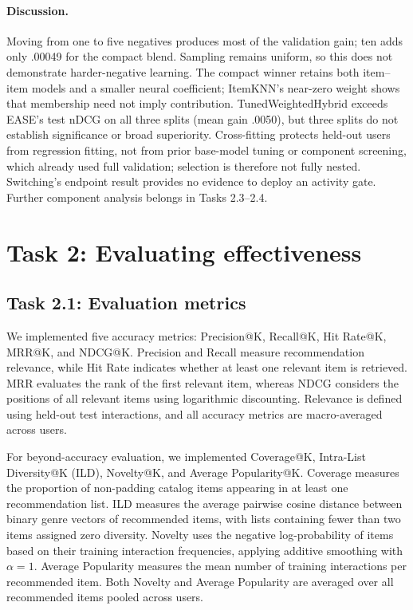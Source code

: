\documentclass[12pt,a4paper]{article}   %
\begin{document}
\paragraph{Discussion.}
Moving from one to five negatives produces most of the validation gain; ten adds only .00049 for the compact blend. Sampling remains uniform, so this does not demonstrate harder-negative learning. The compact winner retains both item--item models and a smaller neural coefficient; ItemKNN's near-zero weight shows that membership need not imply contribution. TunedWeightedHybrid exceeds EASE's test nDCG on all three splits (mean gain .0050), but three splits do not establish significance or broad superiority. Cross-fitting protects held-out users from regression fitting, not from prior base-model tuning or component screening, which already used full validation; selection is therefore not fully nested. Switching's endpoint result provides no evidence to deploy an activity gate. Further component analysis belongs in Tasks 2.3--2.4.

\newpage
\section{Task 2: Evaluating effectiveness}

\subsection{Task 2.1: Evaluation metrics}

We implemented five accuracy metrics: Precision@K,
Recall@K, Hit Rate@K, MRR@K, and NDCG@K.
Precision and Recall measure recommendation relevance,
while Hit Rate indicates whether at least one relevant
item is retrieved. MRR evaluates the rank of the first
relevant item, whereas NDCG considers the positions of
all relevant items using logarithmic discounting.
Relevance is defined using held-out test interactions,
and all accuracy metrics are macro-averaged across users.

For beyond-accuracy evaluation, we implemented Coverage@K,
Intra-List Diversity@K (ILD), Novelty@K, and Average
Popularity@K. Coverage measures the proportion of
non-padding catalog items appearing in at least one
recommendation list. ILD measures the average pairwise
cosine distance between binary genre vectors of recommended
items, with lists containing fewer than two items assigned
zero diversity. Novelty uses the negative log-probability
of items based on their training interaction frequencies,
applying additive smoothing with $\alpha=1$.
Average Popularity measures the mean number of training
interactions per recommended item. Both Novelty and
Average Popularity are averaged over all recommended
items pooled across users.
\end{document}
